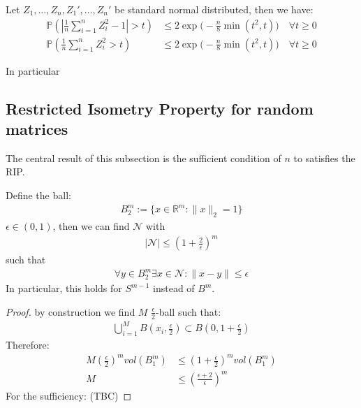 \begin{example}
	Let $Z_1, \dots, Z_n, Z_1', \dots, Z_n'$ be standard normal distributed, then we have:
	\begin{align*}
		\mathbb{P}(|\frac{1}{n}\sum_{i = 1}^n Z_i^2 - 1|> t ) &\le 2\exp \bigg(-\frac{n}{8}\min(t^2, t) \bigg) \quad \forall t \ge 0\\
		\mathbb{P}(\frac{1}{n}\sum_{i = 1}^n Z_i^2 > t) &\le 2\exp\bigg(-\frac{n}{8}\min(t^2,t)\bigg) \quad \forall t \ge 0
	\end{align*}
\end{example}

\begin{example}
	In particular
\end{example}



\subsection{Restricted Isometry Property for random matrices}
The central result of this subsection is the sufficient condition of $n$ to satisfies the RIP.
\begin{lemma}
	Define the ball:
	\begin{align*}
		B_2^m:= \{ x \in \mathbb{R}^m: \|x\|_2 = 1\}
	\end{align*}
	$\epsilon \in (0, 1)$, then we can find $\mathcal{N}$ with 
	\begin{align*}
		|\mathcal{N}| \leq (1 + \frac{2}{\epsilon})^m
	\end{align*}
	such that
	\begin{align*}
		\forall y \in B_2^m \exists x \in \mathcal{N}: \|x - y\| \leq \epsilon
	\end{align*}
	In particular, this holds for $S^{m-1}$ instead of $B^m$.
\end{lemma}
\begin{proof}
	by construction we find $M$ $\frac{\epsilon}{2}$-ball such that:
	\begin{align*}
		\bigcup_{i = 1}^M B(x_i, \frac{\epsilon}{2}) \subset B(0, 1 + \frac{\epsilon}{2})
	\end{align*}
	Therefore:
	\begin{align*}
		M (\frac{\epsilon}{2})^m vol(B_1^m) &\le (1 + \frac{\epsilon}{2})^m vol(B_1^m)\\
		M &\le (\frac{\epsilon + 2}{\epsilon} )^m
	\end{align*}
	For the sufficiency: (TBC)
\end{proof}

